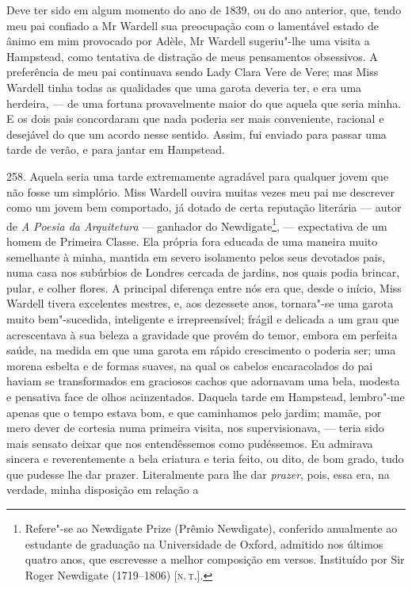 Deve ter sido em algum momento do ano de 1839, ou do ano anterior, que,
tendo meu pai confiado a Mr Wardell sua preocupação com o lamentável
estado de ânimo em mim provocado por Adèle, Mr Wardell sugeriu"-lhe uma
visita a Hampstead, como tentativa de distração de meus pensamentos
obsessivos. A preferência de meu pai continuava sendo Lady Clara Vere de
Vere; mas Miss Wardell tinha todas as qualidades que uma garota deveria
ter, e era uma herdeira, --- de uma fortuna provavelmente maior do que
aquela que seria minha. E os dois pais concordaram que nada poderia ser
mais conveniente, racional e desejável do que um acordo nesse sentido.
Assim, fui enviado para passar uma tarde de verão, e para jantar em
Hampstead.

258. Aquela seria uma tarde extremamente agradável para qualquer jovem
que não fosse um simplório. Miss Wardell ouvira muitas vezes meu pai me
descrever como um jovem bem comportado, já dotado de certa reputação
literária --- autor de \emph{A Poesia da Arquitetura} --- ganhador do
Newdigate\footnote{Refere"-se ao Newdigate Prize (Prêmio Newdigate),
  conferido anualmente ao estudante de graduação na Universidade de
  Oxford, admitido nos últimos quatro anos, que escrevesse a melhor
  composição em versos. Instituído por Sir Roger Newdigate (1719--1806)
  {[}\textsc{n.\,t.}{]}.}, --- expectativa de um homem de Primeira Classe. Ela
própria fora educada de uma maneira muito semelhante à minha, mantida em
severo isolamento pelos seus devotados pais, numa casa nos subúrbios de
Londres cercada de jardins, nos quais podia brincar, pular, e colher
flores. A principal diferença entre nós era que, desde o início, Miss
Wardell tivera excelentes mestres, e, aos dezessete anos, tornara"-se uma
garota muito bem"-sucedida, inteligente e irrepreensível; frágil e
delicada a um grau que acrescentava à sua beleza a gravidade que provém
do temor, embora em perfeita saúde, na medida em que uma garota em
rápido crescimento o poderia ser; uma morena esbelta e de formas suaves,
na qual os cabelos encaracolados do pai haviam se transformados em
graciosos cachos que adornavam uma bela, modesta e pensativa face de
olhos acinzentados. Daquela tarde em Hampstead, lembro"-me apenas que o
tempo estava bom, e que caminhamos pelo jardim; mamãe, por mero dever de
cortesia numa primeira visita, nos supervisionava, --- teria sido mais
sensato deixar que nos entendêssemos como pudéssemos. Eu admirava
sincera e reverentemente a bela criatura e teria feito, ou dito, de bom
grado, tudo que pudesse lhe dar prazer. Literalmente para lhe dar
\emph{prazer}, pois, essa era, na verdade, minha disposição em relação a
